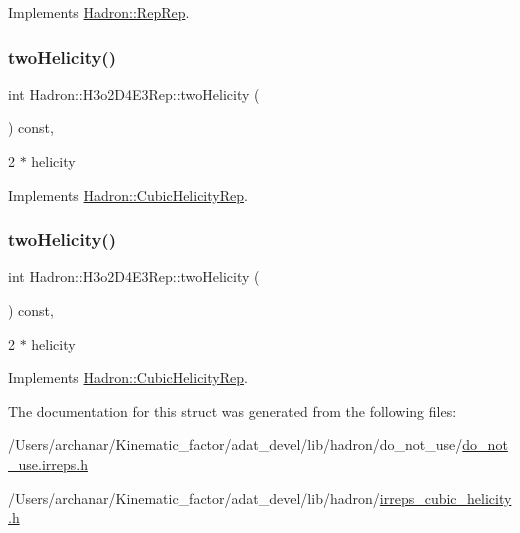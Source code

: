 Implements \mbox{\hyperlink{structHadron_1_1RepRep_ab3213025f6de249f7095892109575fde}{Hadron\+::\+Rep\+Rep}}.

\mbox{\label{structHadron_1_1H3o2D4E3Rep_a1d69cd4cfd1e5aa720df82ab77e8cc8e}} 
\subsubsection{\texorpdfstring{twoHelicity()}{twoHelicity()}\hspace{0.1cm}{\footnotesize\ttfamily [1/2]}}
{\footnotesize\ttfamily int Hadron\+::\+H3o2\+D4\+E3\+Rep\+::two\+Helicity (\begin{DoxyParamCaption}{ }\end{DoxyParamCaption}) const\hspace{0.3cm}{\ttfamily [inline]}, {\ttfamily [virtual]}}

2 $\ast$ helicity 

Implements \mbox{\hyperlink{structHadron_1_1CubicHelicityRep_af507aa56fc2747eacc8cb6c96db31ecc}{Hadron\+::\+Cubic\+Helicity\+Rep}}.

\mbox{\label{structHadron_1_1H3o2D4E3Rep_a1d69cd4cfd1e5aa720df82ab77e8cc8e}} 
\subsubsection{\texorpdfstring{twoHelicity()}{twoHelicity()}\hspace{0.1cm}{\footnotesize\ttfamily [2/2]}}
{\footnotesize\ttfamily int Hadron\+::\+H3o2\+D4\+E3\+Rep\+::two\+Helicity (\begin{DoxyParamCaption}{ }\end{DoxyParamCaption}) const\hspace{0.3cm}{\ttfamily [inline]}, {\ttfamily [virtual]}}

2 $\ast$ helicity 

Implements \mbox{\hyperlink{structHadron_1_1CubicHelicityRep_af507aa56fc2747eacc8cb6c96db31ecc}{Hadron\+::\+Cubic\+Helicity\+Rep}}.



The documentation for this struct was generated from the following files\+:\begin{DoxyCompactItemize}
\item 
/\+Users/archanar/\+Kinematic\+\_\+factor/adat\+\_\+devel/lib/hadron/do\+\_\+not\+\_\+use/\mbox{\hyperlink{do__not__use_8irreps_8h}{do\+\_\+not\+\_\+use.\+irreps.\+h}}\item 
/\+Users/archanar/\+Kinematic\+\_\+factor/adat\+\_\+devel/lib/hadron/\mbox{\hyperlink{lib_2hadron_2irreps__cubic__helicity_8h}{irreps\+\_\+cubic\+\_\+helicity.\+h}}\end{DoxyCompactItemize}
